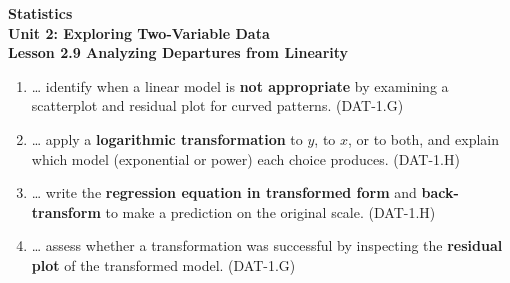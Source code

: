 \documentclass[10pt]{article}
\begin{document}
\vspace{-0.8in}

\begin{center}
  {\color{white}\textbf{\LARGE Statistics}}\\[4pt]
  {\color{skymid}\large\textbf{Unit 2: Exploring Two-Variable Data}}\\[6pt]
  {\color{white}\textbf{\large Lesson 2.9 \quad Analyzing Departures from Linearity}}
\end{center}

\vspace{0.22in}
\namedateperiod
\vspace{0.18in}

\begin{learningtargetbox}
\small
\begin{enumerate}[leftmargin=1.5em, itemsep=5pt]
  \item \ldots{} identify when a linear model is \textbf{not appropriate} by examining a
        scatterplot and residual plot for curved patterns.
        \hfill\textcolor{slate}{\small(DAT-1.G)}
  \item \ldots{} apply a \textbf{logarithmic transformation} to $y$, to $x$, or to both,
        and explain which model (exponential or power) each choice produces.
        \hfill\textcolor{slate}{\small(DAT-1.H)}
  \item \ldots{} write the \textbf{regression equation in transformed form} and
        \textbf{back-transform} to make a prediction on the original scale.
        \hfill\textcolor{slate}{\small(DAT-1.H)}
  \item \ldots{} assess whether a transformation was successful by inspecting the
        \textbf{residual plot} of the transformed model.
        \hfill\textcolor{slate}{\small(DAT-1.G)}
\end{enumerate}
\end{learningtargetbox}

\vspace{0.14in}
\end{document}
